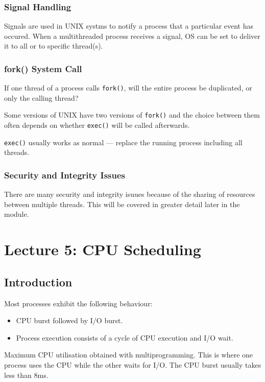 \documentclass{article}%
\begin{document}
\subsubsection{Signal Handling}
Signals are used in UNIX systms to notify a process that a particular event has occured.
When a multithreaded process receives a signal, OS can be set to deliver it to all or to specific thread(s).

\subsubsection{fork() System Call}
If one thread of a process calls {\tt fork()}, will the entire process be duplicated, or only the calling thread?

Some versions of UNIX have two versions of {\tt fork()} and the choice between them often depends on whether {\tt exec()} will be called afterwards.

{\tt exec()} usually works as normal --- replace the running process including all threads.

\subsubsection{Security and Integrity Issues}
There are many security and integrity isuues because of the sharing of resources between multiple threads.
This will be covered in greater detail later in the module.


\maketitle
\section{Lecture 5: CPU Scheduling}
\newpage

\subsection{Introduction}
Most processes exhibit the following behaviour:
\begin{itemize}
	\item CPU burst followed by I/O burst.
	\item Process execution consists of a cycle of CPU execution and I/O wait.
\end{itemize}
Maximum CPU utilisation obtained with multiprogramming.
This is where one process uses the CPU while the other waits for I/O.
The CPU burst usually takes less than 8ms.
\end{document}
